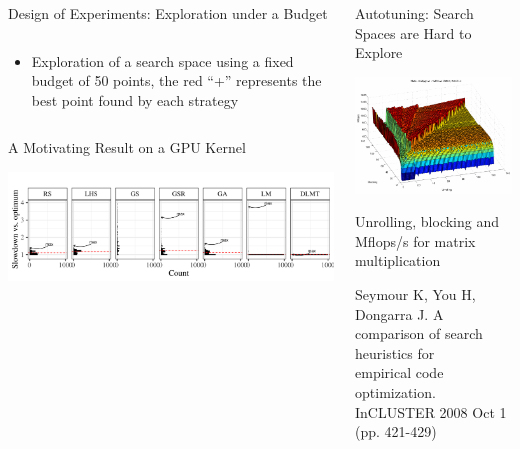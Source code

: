 \documentclass[11pt, compress, aspectratio=169, xcolor={table,usenames,dvipsnames}]{beamer}
\begin{document}
\begin{frame}
\begin{columns}
\begin{column}{0.89\columnwidth}
\begin{columns}
\begin{column}[t]{0.48\columnwidth}
\begin{block}{Design of Experiments: Exploration under a Budget}
\begin{columns}
\begin{column}{0.59\columnwidth}
\begin{itemize}
\item Exploration of a search space using a \alert{fixed budget}
of \alert{50 points}, the \alert{red “+”} represents the best point found by
each strategy
\end{itemize}
\end{column}
\end{columns}
\end{block}
\begin{block}{A Motivating Result on a GPU Kernel}
\begin{center}
\includegraphics[width=0.9\columnwidth]{../../../img/comparison_histogram.pdf}
\end{center}
\end{block}
\end{column}
\begin{column}[t]{0.48\columnwidth}
\begin{block}{Autotuning: Search Spaces are Hard to Explore}
\begin{center}
\includegraphics[width=.7\columnwidth]{../../../img/seymour2008comparison.pdf}
\end{center}

\begin{center}
{\footnotesize
\alert{Unrolling}, \alert{blocking} and \alert{Mflops/s} for \alert{matrix multiplication}
}

\tiny{Seymour K, You H, Dongarra J. A comparison of search heuristics for \\ empirical code optimization. InCLUSTER 2008 Oct 1 (pp. 421-429)}
\vspace{1.3em}
\end{center}


\end{block}
\end{column}
\end{columns}
\end{column}
\end{columns}
\end{frame}
\end{document}
